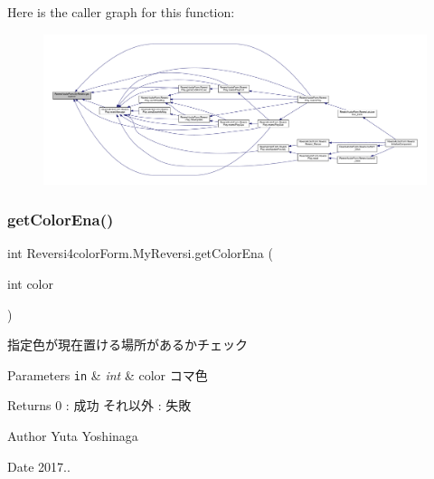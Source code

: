 Here is the caller graph for this function\+:\nopagebreak
\begin{figure}[H]
\begin{center}
\leavevmode
\includegraphics[width=350pt]{class_reversi4color_form_1_1_my_reversi_ae184f1817b7dfac87613179e3e7e9124_icgraph}
\end{center}
\end{figure}
\mbox{\label{class_reversi4color_form_1_1_my_reversi_a5c18ae70cd8a10fee96f44e3a0e8621b}} 
\subsubsection{\texorpdfstring{get\+Color\+Ena()}{getColorEna()}}
{\footnotesize\ttfamily int Reversi4color\+Form.\+My\+Reversi.\+get\+Color\+Ena (\begin{DoxyParamCaption}\item[{int}]{color }\end{DoxyParamCaption})}



指定色が現在置ける場所があるかチェック 


\begin{DoxyParams}[1]{Parameters}
\mbox{\tt in}  & {\em int} & color コマ色 \\
\hline
\end{DoxyParams}
\begin{DoxyReturn}{Returns}
0 \+: 成功 それ以外 \+: 失敗 
\end{DoxyReturn}
\begin{DoxyAuthor}{Author}
Yuta Yoshinaga 
\end{DoxyAuthor}
\begin{DoxyDate}{Date}
2017.. 
\end{DoxyDate}


